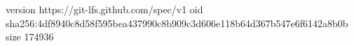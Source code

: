 version https://git-lfs.github.com/spec/v1
oid sha256:4df8940c8d58f595bea437990c8b909c3d606e118b64d367b547e6f6142a8b0b
size 174936
